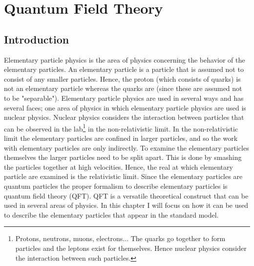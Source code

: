 \part{Quantum Field Theory}

\chapter*{Introduction}
Elementary particle physics is the area of physics concerning the behavior of the elementary particles. An elementary particle is a particle that is assumed not to consist of any smaller particles. Hence, the proton (which consists of quarks) is not an elementary particle whereas the quarks are (since these are assumed not to be "separable"). Elementary particle physics are used in several ways and has several faces; one area of physics in which elementary particle physics are used is nuclear physics. Nuclear physics considers the interaction between particles that can be observed in the lab\footnote{Protons, neutrons, muons, electrons... The quarks go together to form particles and the leptons exist for themselves. Hence nuclear physics consider the interaction between such particles.} in the non-relativistic limit. In the non-relativistic limit the elementary particles are confined in larger particles, and so the work with elementary particles are only indirectly. To examine the elementary particles themselves the larger particles need to be split apart. This is done by smashing the particles together at high velocities. Hence, the real at which elementary particle are examined is the relativistic limit. Since the elementary particles are quantum particles the proper formalism to describe elementary particles is quantum field theory (QFT).
QFT is a versatile theoretical construct that can be used in several areas of physics. In this chapter I will focus on how it can be used to describe the elementary particles that appear in the standard model. 

